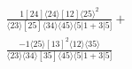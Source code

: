 \documentclass[varwidth, border=5pt]{standalone}
\begin{document}
\begin{my}
$\begin{gathered}
\scriptscriptstyle\frac{1[24]⟨24⟩[12]⟨25⟩^2}{⟨23⟩[25]⟨34⟩⟨45⟩⟨5|1+3|5]}+\\
\scriptscriptstyle\frac{-1⟨25⟩[13]^2⟨12⟩⟨35⟩}{⟨23⟩⟨34⟩[35]⟨45⟩⟨5|1+3|5]}\phantom{+}
\end{gathered}$
\end{my}
\end{document}
